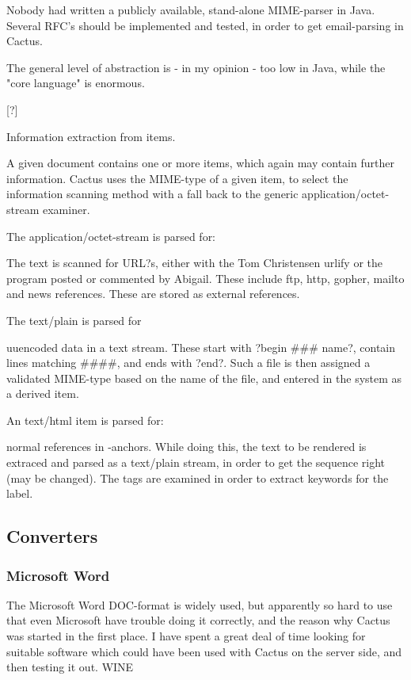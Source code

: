 Nobody had written a publicly available, stand-alone MIME-parser in Java.  Several RFC's should be implemented and tested, in order to get email-parsing in Cactus.

The general level of abstraction is - in my opinion - too low in Java, while the "core language" is enormous.



[?]



Information extraction from items.



A given document contains one or more items, which again may contain
further information.  Cactus uses the MIME-type of a given item, to
select the information scanning method with a fall back to the generic
application/octet-stream examiner.

The application/octet-stream is parsed for:

The text is scanned for URL?s, either with the Tom Christensen urlify
or the program posted or commented by Abigail.  These include ftp,
http, gopher, mailto and news references.  These are stored as
external references.

The text/plain is parsed for

uuencoded data in a text stream.  These start with ?begin \#\#\#
name?, contain lines matching \#\#\#\#, and ends with ?end?.  Such a
file is then assigned a validated MIME-type based on the name of the
file, and entered in the system as a derived item.

An text/html item is parsed for:

normal references in -anchors.  While doing this, the text to
be rendered is extraced and parsed as a text/plain stream, in order to
get the sequence right (may be changed).  The  tags are
examined in order to extract keywords for the label.



\subsection{Converters}
\label{sec:converters}


\subsubsection{Microsoft Word}

The Microsoft Word DOC-format is widely used, but apparently so hard
to use that even Microsoft have trouble doing it correctly, and the
reason why Cactus was started in the first place.  I have spent a
great deal of time looking for suitable software which could have been
used with Cactus on the server side, and then testing it out.
\textsf{WINE}

